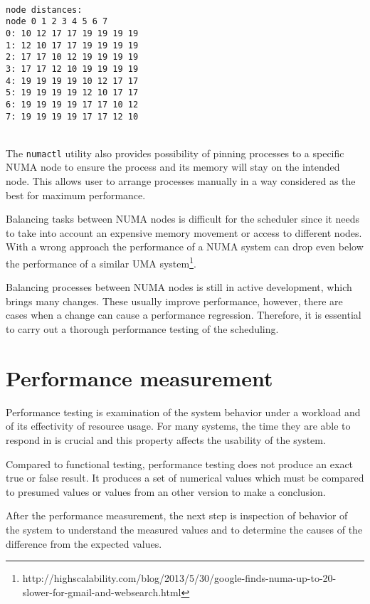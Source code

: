 \begin{minipage}{\linewidth}
\begin{verbatim}

node distances:
node 0 1 2 3 4 5 6 7
0: 10 12 17 17 19 19 19 19
1: 12 10 17 17 19 19 19 19
2: 17 17 10 12 19 19 19 19
3: 17 17 12 10 19 19 19 19
4: 19 19 19 19 10 12 17 17
5: 19 19 19 19 12 10 17 17
6: 19 19 19 19 17 17 10 12
7: 19 19 19 19 17 17 12 10
\end{verbatim}
\end{minipage}\\

The \texttt{numactl} utility also provides possibility of pinning processes to a
specific NUMA node to ensure the process and its memory will stay on the
intended node. This allows user to arrange processes manually in a way considered
as the best for maximum performance.

Balancing tasks between NUMA nodes is difficult for the scheduler since it needs
to take into account an expensive memory movement or access to different nodes.
With a wrong approach the performance of a NUMA system can drop even below the
performance of a similar UMA
system\footnote{http://highscalability.com/blog/2013/5/30/google-finds-numa-up-to-20-slower-for-gmail-and-websearch.html}.

Balancing processes between NUMA nodes is still in active development, which
brings many changes. These usually improve performance, however, there are cases
when a change can cause a performance regression. Therefore, it is essential to
carry out a thorough performance testing of the scheduling.



\chapter{Performance measurement} \label{ch:measurement}
Performance testing is examination of the system behavior under a workload and of its
effectivity of resource usage. For many systems, the time they are able to
respond in is crucial and this property affects the usability of the system.

Compared to functional testing, performance testing does not produce an exact true
or false result. It produces a set of numerical values which must be compared to
presumed values or values from an other version to make a conclusion.

After the performance measurement, the next step is inspection of behavior of
the system to understand the measured values and to determine the causes of the
difference from the expected values.

